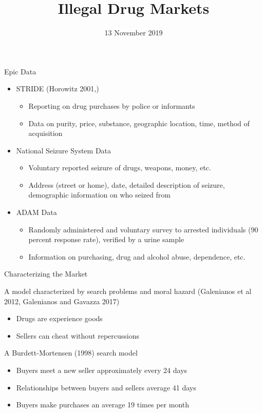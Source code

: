 \documentclass[10pt,ignorenonframetext,]{beamer}
\title{Illegal Drug Markets}
\date{13 November 2019}
\providecommand{\tightlist}{%
  \setlength{\itemsep}{0pt}\setlength{\parskip}{0pt}}
\begin{document}
\frame{\titlepage}

\begin{frame}{Epic Data}
\protect\hypertarget{epic-data}{}

\begin{itemize}
\tightlist
\item
  STRIDE (Horowitz 2001,)

  \begin{itemize}
  \tightlist
  \item
    Reporting on drug purchases by police or informants
  \item
    Data on purity, price, substance, geographic location, time, method
    of acquisition
  \end{itemize}
\item
  National Seizure System Data

  \begin{itemize}
  \tightlist
  \item
    Voluntary reported seizure of drugs, weapons, money, etc.
  \item
    Address (street or home), date, detailed description of seizure,
    demographic information on who seized from
  \end{itemize}
\item
  ADAM Data

  \begin{itemize}
  \tightlist
  \item
    Randomly administered and voluntary survey to arrested individuals
    (90 percent response rate), verified by a urine sample
  \item
    Information on purchasing, drug and alcohol abuse, dependence, etc.
  \end{itemize}
\end{itemize}

\end{frame}

\begin{frame}{Characterizing the Market}
\protect\hypertarget{characterizing-the-market}{}

A model characterized by search problems and moral hazard (Galenianos et
al 2012, Galenianos and Gavazza 2017)

\begin{itemize}
\tightlist
\item
  Drugs are experience goods
\item
  Sellers can cheat without repercussions
\end{itemize}

A Burdett-Mortensen (1998) search model

\begin{itemize}
\tightlist
\item
  Buyers meet a new seller approximately every 24 days
\item
  Relationships between buyers and sellers average 41 days
\item
  Buyers make purchases an average 19 times per month
\end{itemize}

\end{frame}
\end{document}
